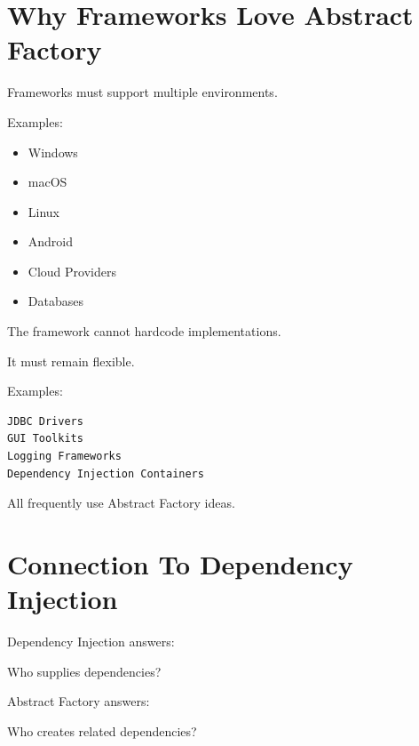 \documentclass[11pt,a4paper]{book}
\begin{document}

\section{Why Frameworks Love Abstract Factory}

\begin{idea}

Frameworks must support multiple environments.

Examples:

\begin{itemize}
\item Windows
\item macOS
\item Linux
\item Android
\item Cloud Providers
\item Databases
\end{itemize}

The framework cannot hardcode implementations.

It must remain flexible.

\end{idea}

Examples:

\begin{verbatim}
JDBC Drivers
GUI Toolkits
Logging Frameworks
Dependency Injection Containers
\end{verbatim}

All frequently use Abstract Factory ideas.


\section{Connection To Dependency Injection}

\begin{idea}

Dependency Injection answers:

\begin{center}
Who supplies dependencies?
\end{center}

Abstract Factory answers:

\begin{center}
Who creates related dependencies?
\end{center}

\end{idea}
\end{document}
